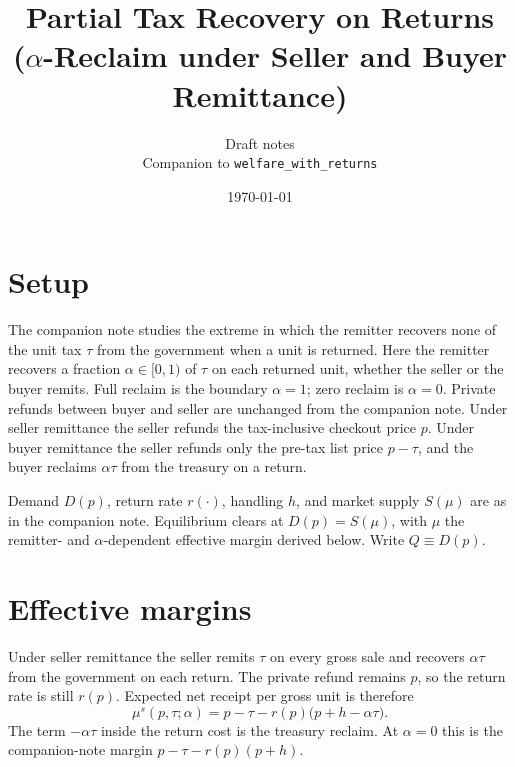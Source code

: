 \documentclass[11pt]{article}
\title{Partial Tax Recovery on Returns\\
  ($\alpha$-Reclaim under Seller and Buyer Remittance)}
\author{Draft notes\\
  Companion to \texttt{welfare\_with\_returns}}
\date{\today}
\begin{document}
\maketitle

\section{Setup}

The companion note studies the extreme in which the remitter recovers none of
the unit tax $\tau$ from the government when a unit is returned.  Here the
remitter recovers a fraction $\alpha\in[0,1)$ of $\tau$ on each returned
unit, whether the seller or the buyer remits.  Full reclaim is the boundary
$\alpha=1$; zero reclaim is $\alpha=0$.  Private refunds between buyer and
seller are unchanged from the companion note.  Under seller remittance the
seller refunds the tax-inclusive checkout price $p$.  Under buyer remittance
the seller refunds only the pre-tax list price $p-\tau$, and the buyer
reclaims $\alpha\tau$ from the treasury on a return.

Demand $D(p)$, return rate $r(\cdot)$, handling $h$, and market supply
$S(\mu)$ are as in the companion note.  Equilibrium clears at
$D(p)=S(\mu)$, with $\mu$ the remitter- and $\alpha$-dependent effective
margin derived below.  Write $Q\equiv D(p)$.

\section{Effective margins}

Under seller remittance the seller remits $\tau$ on every gross sale and
recovers $\alpha\tau$ from the government on each return.  The private refund
remains $p$, so the return rate is still $r(p)$.  Expected net receipt per
gross unit is therefore
\begin{equation}
  \mu^{s}(p,\tau;\alpha)
  = p-\tau-r(p)\bigl(p+h-\alpha\tau\bigr).
  \label{eq:mu-s-alpha}
\end{equation}
The term $-\alpha\tau$ inside the return cost is the treasury reclaim.  At
$\alpha=0$ this is the companion-note margin $p-\tau-r(p)(p+h)$.
\end{document}
